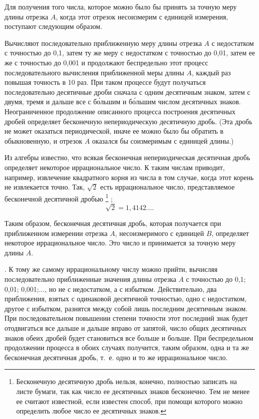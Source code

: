 \documentclass[oneside]{book}
\begin{document}
Для получения того числа, которое можно было бы принять за точную меру длины отрезка $A$, когда этот отрезок несоизмерим с единицей измерения, поступают следующим образом.

Вычисляют последовательно приближенную меру длины отрезка $A$ с недостатком с точностью до 0,1, затем ту же меру с недостатком с точностью до 0,01, затем ее же с точностью до 0,001 и продолжают беспредельно этот процесс последовательного вычисления приближенной меры длины $A$, каждый раз повышая точность в 10 раз.
При таком процессе будут получаться последовательно десятичные дроби сначала с одним десятичным знаком, затем с двумя, тремя и дальше все с б\'{о}льшим и б\'{о}льшим числом десятичных знаков.
Неограниченное продолжение описанного процесса построения десятичных дробей определяет бесконечную непериодическую десятичную дробь.
(Эта дробь не может оказаться периодической, иначе ее можно было бы обратить в обыкновенную, и отрезок $A$ оказался бы соизмеримым с единицей длины.)

Из алгебры известно, что всякая бесконечная непериодическая десятичная дробь определяет некоторое иррациональное число.
К таким числам приводит, например, извлечение квадратного корня из числа в том случае, когда этот корень не извлекается точно.
Так, $\sqrt{2}$ есть иррациональное число, представляемое бесконечной десятичной дробью%
\footnote{Бесконечную десятичную дробь нельзя, конечно, полностью записать на листе бумаги, так как число ее десятичных знаков бесконечно.
Тем не менее ее считают известной, если известен способ, при помощи которого можно определить любое число ее десятичных знаков.}%
;
\[\sqrt{2}  = 1,4142\dots .\]

Таким образом, бесконечная десятичная дробь, которая получается при приближенном измерении отрезка $A$, несоизмеримого с единицей $B$, определяет некоторое иррациональное число.
Это число и принимается за точную меру длины $A$.

.
К тому же самому иррациональному числу можно прийти, вычисляя последовательно приближенные значения длины отрезка $A$ с точностью до 0,1;
0,01;
0,001;..., но не с недостатком, а с избытком.
Действительно, два приближения, взятых с одинаковой десятичной точностью, одно с недостатком, другое с избытком, разнятся между собой лишь последним десятичным знаком.
При последовательном повышении степени точности этот последний знак будет отодвигаться все дальше и дальше вправо от запятой, число общих десятичных знаков обеих дробей будет становиться все больше и больше.
При беспредельном продолжении процесса в обоих случаях получится, таким образом, одна и та же бесконечная десятичная дробь, т.~е.
одно и то же иррациональное число.
\end{document}
